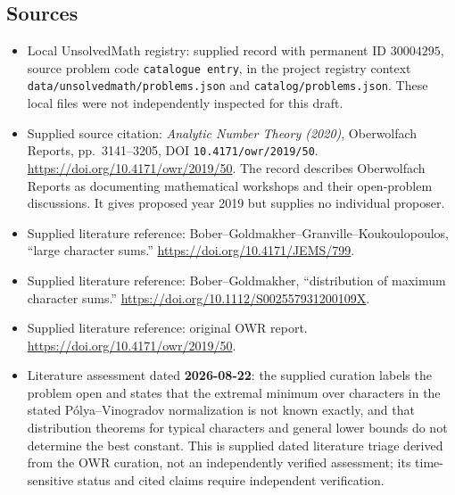 \documentclass[11pt]{article}
\begin{document}
\subsection{Sources}
\begin{itemize}
\item Local UnsolvedMath registry: supplied record with permanent ID \(30004295\), source problem code \texttt{catalogue entry}, in the project registry context \texttt{data/unsolvedmath/problems.json} and \texttt{catalog/problems.json}. These local files were not independently inspected for this draft.
\item Supplied source citation: \emph{Analytic Number Theory (2020)}, Oberwolfach Reports, pp.~3141--3205, DOI \texttt{10.4171/owr/2019/50}. \url{https://doi.org/10.4171/owr/2019/50}. The record describes Oberwolfach Reports as documenting mathematical workshops and their open-problem discussions. It gives proposed year 2019 but supplies no individual proposer.
\item Supplied literature reference: Bober--Goldmakher--Granville--Koukoulopoulos, ``large character sums.'' \url{https://doi.org/10.4171/JEMS/799}.
\item Supplied literature reference: Bober--Goldmakher, ``distribution of maximum character sums.'' \url{https://doi.org/10.1112/S002557931200109X}.
\item Supplied literature reference: original OWR report. \url{https://doi.org/10.4171/owr/2019/50}.
\item Literature assessment dated \textbf{2026-08-22}: the supplied curation labels the problem open and states that the extremal minimum over characters in the stated P\'olya--Vinogradov normalization is not known exactly, and that distribution theorems for typical characters and general lower bounds do not determine the best constant. This is supplied dated literature triage derived from the OWR curation, not an independently verified assessment; its time-sensitive status and cited claims require independent verification.
\end{itemize}
\end{document}

